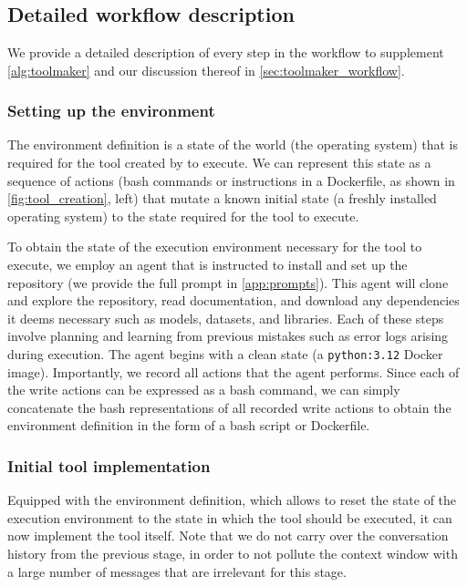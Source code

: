 \newpage
\appendix
\onecolumn
\section{\Ours}

\subsection{Detailed workflow description}
We provide a detailed description of every step in the \ours workflow to supplement \cref{alg:toolmaker} and our discussion thereof in \cref{sec:toolmaker_workflow}.

\subsubsection{Setting up the environment}
The environment definition is a state of the world (\eg the operating system) that is required for the tool created by \ours to execute.
We can represent this state as a sequence of actions (\eg bash commands or instructions in a Dockerfile, as shown in \cref{fig:tool_creation}, left) that mutate a known initial state (\eg a freshly installed operating system) to the state required for the tool to execute.

To obtain the state of the execution environment necessary for the tool to execute, we employ an agent\: that is instructed to install and set up the repository (we provide the full prompt in \cref{app:prompts}).
This agent will clone and explore the repository, read documentation, and download any dependencies it deems necessary such as models, datasets, and libraries. Each of these steps involve planning and learning from previous mistakes such as error logs arising during execution.
The agent begins with a clean state (a \mbox{\texttt{python:3.12}} Docker image).
Importantly, we record all actions\: that the agent performs.
Since each of the write actions can be expressed as a bash command, we can simply concatenate the bash representations of all recorded write actions to obtain the environment definition in the form of a bash script or Dockerfile.


\subsubsection{Initial tool implementation}
Equipped with the environment definition, which allows \ours to reset the state of the execution environment to the state in which the tool should be executed, it can now implement the tool itself.
Note that we do not carry over the conversation history from the previous stage, in order to not pollute the context window with a large number of messages that are irrelevant for this stage.

